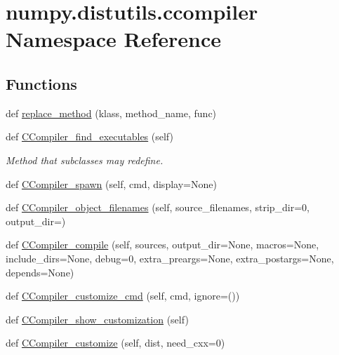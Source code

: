 \hypertarget{namespacenumpy_1_1distutils_1_1ccompiler}{}\section{numpy.\+distutils.\+ccompiler Namespace Reference}
\label{namespacenumpy_1_1distutils_1_1ccompiler}
\subsection*{Functions}
\begin{DoxyCompactItemize}
\item 
def \hyperlink{namespacenumpy_1_1distutils_1_1ccompiler_ad54f5f4eeda45b9951781d9bfdff4f3e}{replace\+\_\+method} (klass, method\+\_\+name, func)
\item 
def \hyperlink{namespacenumpy_1_1distutils_1_1ccompiler_af6507e9e00649b8f91a963f0e919d835}{C\+Compiler\+\_\+find\+\_\+executables} (self)
\begin{DoxyCompactList}\small\item\em Method that subclasses may redefine. \end{DoxyCompactList}\item 
def \hyperlink{namespacenumpy_1_1distutils_1_1ccompiler_aa07416f7e654ea7e8d5da1592fe4c988}{C\+Compiler\+\_\+spawn} (self, cmd, display=None)
\item 
def \hyperlink{namespacenumpy_1_1distutils_1_1ccompiler_a94bc265712bf86681f2d77de6513c511}{C\+Compiler\+\_\+object\+\_\+filenames} (self, source\+\_\+filenames, strip\+\_\+dir=0, output\+\_\+dir=\textquotesingle{}\textquotesingle{})
\item 
def \hyperlink{namespacenumpy_1_1distutils_1_1ccompiler_a3e609541af4c13a3cac3a96b2bcd8e64}{C\+Compiler\+\_\+compile} (self, sources, output\+\_\+dir=None, macros=None, include\+\_\+dirs=None, debug=0, extra\+\_\+preargs=None, extra\+\_\+postargs=None, depends=None)
\item 
def \hyperlink{namespacenumpy_1_1distutils_1_1ccompiler_aa3b6bde09311dab188b0dd62722a3e21}{C\+Compiler\+\_\+customize\+\_\+cmd} (self, cmd, ignore=())
\item 
def \hyperlink{namespacenumpy_1_1distutils_1_1ccompiler_a44ee8712b1e71377c82f3eab1f679678}{C\+Compiler\+\_\+show\+\_\+customization} (self)
\item 
def \hyperlink{namespacenumpy_1_1distutils_1_1ccompiler_ad092561ded869aafe3f61d069bf092c2}{C\+Compiler\+\_\+customize} (self, dist, need\+\_\+cxx=0)
\item 

\end{DoxyCompactItemize}
